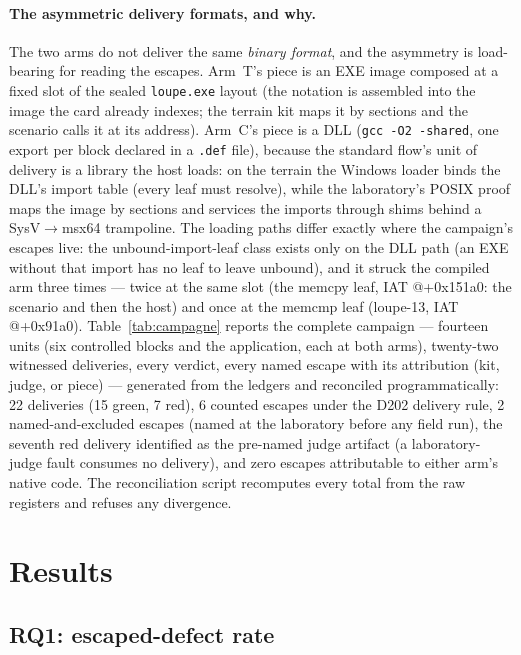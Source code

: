 \documentclass[11pt,a4paper]{article}
\newcommand{\code}[1]{\texttt{\small #1}}
\begin{document}
\paragraph{The asymmetric delivery formats, and why.} The two arms do
not deliver the same \emph{binary format}, and the asymmetry is
load-bearing for reading the escapes. Arm~T's piece is an EXE image
composed at a fixed slot of the sealed \code{loupe.exe} layout (the
notation is assembled into the image the card already indexes; the
terrain kit maps it by sections and the scenario calls it at its
address). Arm~C's piece is a DLL (\code{gcc -O2 -shared}, one export
per block declared in a \code{.def} file), because the standard flow's
unit of delivery is a library the host loads: on the terrain the
Windows loader binds the DLL's import table (every leaf must resolve),
while the laboratory's POSIX proof maps the image by sections and
services the imports through shims behind a SysV$\to$msx64 trampoline.
The loading paths differ exactly where the campaign's escapes live:
the unbound-import-leaf class exists only on the DLL path (an EXE
without that import has no leaf to leave unbound), and it struck the
compiled arm three times --- twice at the same slot (the memcpy leaf,
IAT @+0x151a0: the scenario and then the host) and once at the memcmp
leaf (loupe-13, IAT @+0x91a0). Table~\ref{tab:campagne}
reports the complete campaign --- fourteen units (six controlled blocks
and the application, each at both arms), twenty-two witnessed
deliveries, every verdict, every named escape with its attribution
(kit, judge, or piece) --- generated from the ledgers and reconciled
programmatically: 22 deliveries (15 green, 7 red), 6 counted escapes
under the D202 delivery rule, 2 named-and-excluded escapes (named at
the laboratory before any field run), the seventh red delivery
identified as the pre-named judge artifact (a laboratory-judge fault
consumes no delivery), and zero escapes attributable to either arm's
native code. The reconciliation script recomputes every total from the
raw registers and refuses any divergence.



\section{Results}\label{sec:results}

\subsection{RQ1: escaped-defect rate}\label{sec:rq1}
\end{document}
